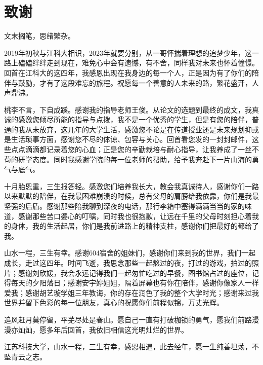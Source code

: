 	{\centering \chapter *{致\qquad 谢}}
	
	\markboth{}{}
	文末搁笔，思绪繁杂。

2019年初秋与江科大相识，2023年就要分别，从一哥怀揣着理想的追梦少年，这一路上磕磕绊绊走到现在，难免心中会有遗憾，有不舍，同样我对未来也怀着憧憬。回首在江科大的这四年，我感恩出现在我身边的每一个人，正是因为有了你们的陪伴与鼓励，才有了这段难忘的旅程。祝愿每一个善意的人未来的路，繁花盛开，人声鼎沸。

桃李不言，下自成蹊。感谢我的指导老师王俊。从论文的选题到最终的成文，我真诚的感激您倾尽所能的指导与点拨，我不是一个优秀的学生，但是有您的陪伴，普通的我从未放弃，这几年的大学生活，感激您不论是在传道授业还是未来规划抑或是生活琐事方面，感谢您不尽的体谅、包容与关心。回首看您发的一封封邮件，这些点点滴滴都记录着您的心血；正是您的辛勤栽培与耐心指导，让我养成了一丝不苟的研学态度。同时我感谢学院的每一位老师的帮助，给予我奔赴下一片山海的勇气与底气。

十月胎恩重，三生报答轻。感激您们培养我长大，教会我真诚待人，感谢你们一路以来默默的陪伴，在我最困难崩溃的时候，总有父母的肩膀给我依靠，你们是我最坚强的后盾。感谢那些陪我聊到深夜的电话，那行李箱中塞得满满当当的家的味道，感谢那些苦口婆心的叮嘱，同时我也很抱歉，让远在千里的父母时刻担心着我的身体，我的生活起居，你们是我前进路上的精神支柱，感谢你们把最好的都给了我。

山水一程，三生有幸。感谢604宿舍的姐妹们，感谢你们来到我的世界，我们一起成长，走过这四年。时间飞逝，我思念那些一起熬过的夜，打过的游戏，拍过的照片；感谢刘欣媛，我会永远记得我们一起匆忙吃过的早餐，图书馆占过的座位，记得每天的夕阳落日；感谢安宇婷姐姐，隔着屏幕也有你在陪伴，感谢你像家人一样爱我；感谢胡艺璇学姐三年教诲，你的存在润色了我的整个大学时光；感谢来过我世界并留下色彩的每一位朋友，真心的祝愿你们前程似锦，万丈光辉。

追风赶月莫停留，平芜尽处是春山。愿自己一直有打破枷锁的勇气，愿我们前路漫漫亦灿灿，愿多年后回首，我依旧相信这光明灿烂的世界。

江苏科技大学，山水一程，三生有幸，感恩相遇，此去经年，愿一生纯善坦荡，不坠青云之志。
